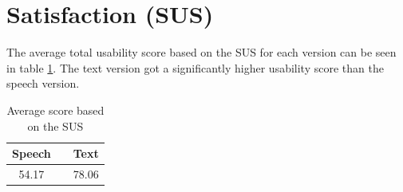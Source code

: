\section{Satisfaction (SUS)} 
The average total usability score based on the SUS for each version can be seen in table \ref{tot_score}. The text version got a significantly higher usability score than the speech version.

\begin{table}[ht]
  \centering
  \begin{tabular}{ccc}
    \toprule
    Speech &   & Text\\
    \midrule
    54.17 &   & 78.06\\
    \bottomrule
  \end{tabular}
  \caption{Average score based on the SUS}\label{tot_score}
\end{table}
